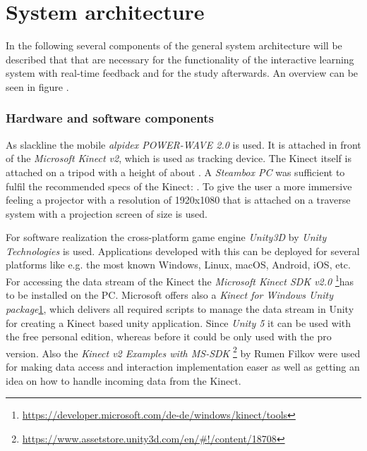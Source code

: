 \section{System architecture}\label{5_2_systemArchitecture}
In the following several components of the general system architecture will be described that that are necessary for the functionality of the interactive learning system with real-time feedback and for the study afterwards. An overview can be seen in figure .

\subsubsection{Hardware and software components}

As slackline the mobile \textit{alpidex POWER-WAVE 2.0} is used. It is attached in front of the \textit{Microsoft Kinect v2}, which is used as tracking device. The Kinect itself is attached on a  tripod with a height of about . A \textit{Steambox PC}  was sufficient to fulfil the recommended specs of the Kinect: . To give the user a more immersive feeling a projector  with a resolution of 1920x1080 that is attached on a traverse system with a projection screen of size  is used.

For software realization the cross-platform game engine \textit{Unity3D} by \textit{Unity Technologies} is used. Applications developed with this can be deployed for several platforms like e.g. the most known Windows, Linux, macOS, Android, iOS, etc. For accessing the data stream of the Kinect the \textit{Microsoft Kinect SDK v2.0}
\footnote{\label{fn:kinectTools}\url{https://developer.microsoft.com/de-de/windows/kinect/tools}}has to be installed on the PC. Microsoft offers also a \textit{Kinect for Windows Unity package}\cref{fn:kinectTools}, which delivers all required scripts to manage the data stream in Unity for creating a Kinect based unity application. Since \textit{Unity 5} it can be used with the free personal edition, whereas before it could be only used with the pro version. Also the \textit{Kinect v2 Examples with MS-SDK} \footnote{\url{https://www.assetstore.unity3d.com/en/\#!/content/18708}} by Rumen Filkov were used for making data access and interaction implementation easer as well as getting an idea on how to handle incoming data from the Kinect.


